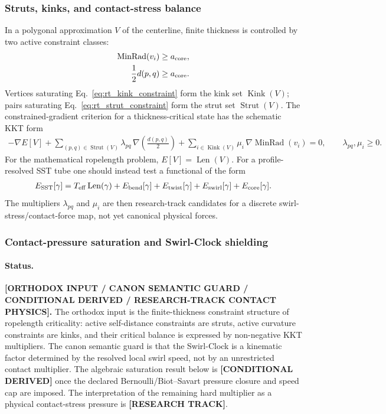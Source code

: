 \subsubsection{Struts, kinks, and contact-stress balance}
In a polygonal approximation $V$ of the centerline, finite thickness is
controlled by two active constraint classes:
\begin{align}
    \operatorname{MinRad}(v_i)&\ge a_{\rm core},
    \label{eq:rt_kink_constraint}\\
    \frac12 d(p,q)&\ge a_{\rm core}.
    \label{eq:rt_strut_constraint}
\end{align}
Vertices saturating Eq.~\eqref{eq:rt_kink_constraint} form the kink set
$\operatorname{Kink}(V)$; pairs saturating Eq.~\eqref{eq:rt_strut_constraint}
form the strut set $\operatorname{Strut}(V)$.  The constrained-gradient
criterion for a thickness-critical state has the schematic KKT form
\begin{align}
    -\nabla E[V]
    +
    \sum_{(p,q)\in\operatorname{Strut}(V)}
        \lambda_{pq}\,
        \nabla\!\left(\frac{d(p,q)}{2}\right)
    +
    \sum_{i\in\operatorname{Kink}(V)}
        \mu_i\,\nabla\operatorname{MinRad}(v_i)
    =0,
    \qquad
    \lambda_{pq},\mu_i\ge0 .
    \label{eq:rt_contact_kkt_balance}
\end{align}
For the mathematical ropelength problem, $E[V]=\operatorname{Len}(V)$.  For a
profile-resolved SST tube one should instead test a functional of the form
\begin{align}
    E_{\rm SST}[\gamma]
    =
    T_{\rm eff}\operatorname{Len}(\gamma)
    +E_{\rm bend}[\gamma]
    +E_{\rm twist}[\gamma]
    +E_{\rm swirl}[\gamma]
    +E_{\rm core}[\gamma] .
    \label{eq:rt_resolved_tube_energy}
\end{align}
The multipliers $\lambda_{pq}$ and $\mu_i$ are then research-track candidates
for a discrete swirl-stress/contact-force map, not yet canonical physical
forces.

\subsubsection{Contact-pressure saturation and Swirl-Clock shielding}
\label{subsec:rt_contact_pressure_saturation_swirl_clock}

\paragraph{Status.}
\textbf{[ORTHODOX INPUT / CANON SEMANTIC GUARD / CONDITIONAL DERIVED / RESEARCH-TRACK CONTACT PHYSICS].}
The orthodox input is the finite-thickness constraint structure of ropelength
criticality: active self-distance constraints are struts, active curvature
constraints are kinks, and their critical balance is expressed by non-negative
KKT multipliers.  The canon semantic guard is that the Swirl-Clock is a
kinematic factor determined by the resolved local swirl speed, not by an
unrestricted contact multiplier.  The algebraic saturation result below is
\textbf{[CONDITIONAL DERIVED]} once the declared Bernoulli/Biot--Savart pressure
closure and speed cap are imposed.  The interpretation of the remaining hard
multiplier as a physical contact-stress pressure is \textbf{[RESEARCH TRACK]}.

